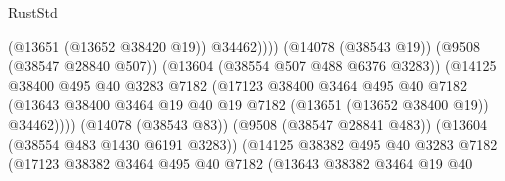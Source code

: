 \begin{lexlean}{RustStd}
\begin{coremodule}
                                                    (@13651 (@13652 @38420 @19))
                                                    @34462))))
                                            (@14078 (@38543 @19))
                                            (@9508 (@38547 @28840 @507))
                                            (@13604 (@38554 @507 @488 @6376 @3283))
                                            (@14125
                                              @38400
                                              @495
                                              @40
                                              @3283
                                              @7182
                                              (@17123
                                                @38400
                                                @3464
                                                @495
                                                @40
                                                @7182
                                                (@13643
                                                  @38400
                                                  @3464
                                                  @19
                                                  @40
                                                  @19
                                                  @7182
                                                  (@13651 (@13652 @38400 @19))
                                                  @34462))))
                                          (@14078 (@38543 @83))
                                          (@9508 (@38547 @28841 @483))
                                          (@13604 (@38554 @483 @1430 @6191 @3283))
                                          (@14125
                                            @38382
                                            @495
                                            @40
                                            @3283
                                            @7182
                                            (@17123
                                              @38382
                                              @3464
                                              @495
                                              @40
                                              @7182
                                              (@13643
                                                @38382
                                                @3464
                                                @19
                                                @40

\end{coremodule}
\end{lexlean}
